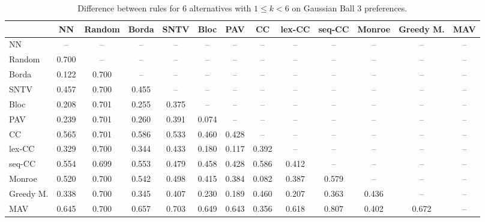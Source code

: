 
\begin{table*}[htbp]
\centering
\begin{tabular}{lcccccccccccc}
\toprule
 & NN & Random & Borda & SNTV & Bloc & PAV & CC & lex-CC & seq-CC & Monroe & Greedy M. & MAV \\
\midrule
NN & -- & -- & -- & -- & -- & -- & -- & -- & -- & -- & -- & -- \\
Random & \cellcolor{blue!70} 0.700 & -- & -- & -- & -- & -- & -- & -- & -- & -- & -- & -- \\
Borda & \cellcolor{blue!12} 0.122 & \cellcolor{blue!70} 0.700 & -- & -- & -- & -- & -- & -- & -- & -- & -- & -- \\
SNTV & \cellcolor{blue!45} 0.457 & \cellcolor{blue!70} 0.700 & \cellcolor{blue!45} 0.455 & -- & -- & -- & -- & -- & -- & -- & -- & -- \\
Bloc & \cellcolor{blue!20} 0.208 & \cellcolor{blue!70} 0.701 & \cellcolor{blue!25} 0.255 & \cellcolor{blue!37} 0.375 & -- & -- & -- & -- & -- & -- & -- & -- \\
PAV & \cellcolor{blue!23} 0.239 & \cellcolor{blue!70} 0.701 & \cellcolor{blue!26} 0.260 & \cellcolor{blue!39} 0.391 & \cellcolor{blue!7} 0.074 & -- & -- & -- & -- & -- & -- & -- \\
CC & \cellcolor{blue!56} 0.565 & \cellcolor{blue!70} 0.701 & \cellcolor{blue!58} 0.586 & \cellcolor{blue!53} 0.533 & \cellcolor{blue!46} 0.460 & \cellcolor{blue!42} 0.428 & -- & -- & -- & -- & -- & -- \\
lex-CC & \cellcolor{blue!32} 0.329 & \cellcolor{blue!70} 0.700 & \cellcolor{blue!34} 0.344 & \cellcolor{blue!43} 0.433 & \cellcolor{blue!18} 0.180 & \cellcolor{blue!11} 0.117 & \cellcolor{blue!39} 0.392 & -- & -- & -- & -- & -- \\
seq-CC & \cellcolor{blue!55} 0.554 & \cellcolor{blue!69} 0.699 & \cellcolor{blue!55} 0.553 & \cellcolor{blue!47} 0.479 & \cellcolor{blue!45} 0.458 & \cellcolor{blue!42} 0.428 & \cellcolor{blue!58} 0.586 & \cellcolor{blue!41} 0.412 & -- & -- & -- & -- \\
Monroe & \cellcolor{blue!52} 0.520 & \cellcolor{blue!70} 0.700 & \cellcolor{blue!54} 0.542 & \cellcolor{blue!49} 0.498 & \cellcolor{blue!41} 0.415 & \cellcolor{blue!38} 0.384 & \cellcolor{blue!8} 0.082 & \cellcolor{blue!38} 0.387 & \cellcolor{blue!57} 0.579 & -- & -- & -- \\
Greedy M. & \cellcolor{blue!33} 0.338 & \cellcolor{blue!70} 0.700 & \cellcolor{blue!34} 0.345 & \cellcolor{blue!40} 0.407 & \cellcolor{blue!23} 0.230 & \cellcolor{blue!18} 0.189 & \cellcolor{blue!46} 0.460 & \cellcolor{blue!20} 0.207 & \cellcolor{blue!36} 0.363 & \cellcolor{blue!43} 0.436 & -- & -- \\
MAV & \cellcolor{blue!64} 0.645 & \cellcolor{blue!70} 0.700 & \cellcolor{blue!65} 0.657 & \cellcolor{blue!70} 0.703 & \cellcolor{blue!64} 0.649 & \cellcolor{blue!64} 0.643 & \cellcolor{blue!35} 0.356 & \cellcolor{blue!61} 0.618 & \cellcolor{blue!80} 0.807 & \cellcolor{blue!40} 0.402 & \cellcolor{blue!67} 0.672 & -- \\
\bottomrule
\end{tabular}

\caption{Difference between rules for 6 alternatives with $1 \leq k < 6$ on Gaussian Ball 3 preferences.}
\label{tab:rule_distance_heatmap-m=[6]-pref_dist=euclidean__args__dimensions=3_-_space=gaussian_ball}
\end{table*}
    